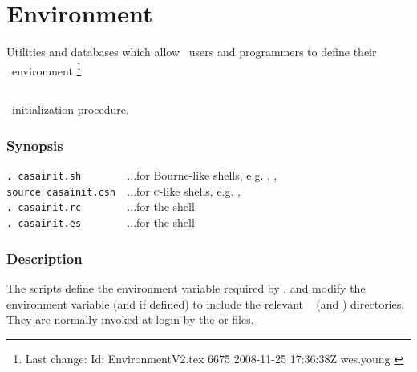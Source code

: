 \chapter{Environment}
\label{Environment}

Utilities and databases which allow \aipspp\ users and programmers to
define their \aipspp\ environment \footnote{Last change:
$ $Id: EnvironmentV2.tex 6675 2008-11-25 17:36:38Z wes.young $ $}.


\section{}
\label{casainit}
\label{casainit.csh}
\label{casainit.sh}

\aipspp\ initialization procedure.

\subsection*{Synopsis}

\begin{synopsis}
   \verb+. casainit.sh        +...for Bourne-like shells, e.g. ,
                                  ,  \\
   \verb+source casainit.csh  +...for \textsc{c}-like shells, e.g.
                                  ,  \\
   \verb+. casainit.rc        +...for the  shell \\
   \verb+. casainit.es        +...for the  shell
\end{synopsis}

\subsection*{Description}

The  scripts define the  environment variable
required by \aipspp, and modify the  environment variable (and
 if defined) to include the relevant \aipspp\  (and
) directories.  They are normally invoked at login by the
 or  files.

